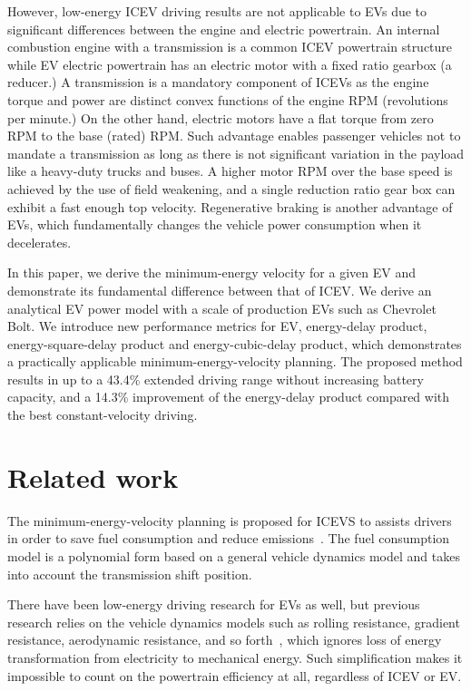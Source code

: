 \documentclass{IEEEtran}
\begin{document}
However, low-energy ICEV driving results are not applicable to EVs due to significant differences 
between the engine  and electric  powertrain. An internal combustion engine with a transmission is a common ICEV powertrain structure while EV electric powertrain has an electric motor with a fixed ratio gearbox (a reducer.) A transmission is a mandatory component of ICEVs as the engine torque and power are distinct convex functions of the engine RPM (revolutions per minute.) On the other hand, electric motors have a flat torque from zero RPM to the base (rated) RPM. Such advantage enables passenger vehicles not to mandate a transmission as long as there is not significant variation in the payload like a heavy-duty trucks and buses. A higher motor RPM over the base speed is achieved by the use of field weakening, and a single reduction ratio gear box can exhibit a fast enough top velocity. Regenerative braking is another advantage of EVs, which fundamentally changes the vehicle power consumption when it decelerates.

In this paper, we derive the minimum-energy velocity for a given EV and demonstrate its fundamental difference between that of ICEV. 
We derive an analytical EV power model with a scale of production EVs such as Chevrolet  Bolt. We introduce new performance metrics for EV, energy-delay product, energy-square-delay product and energy-cubic-delay product, which demonstrates a practically applicable minimum-energy-velocity planning. The proposed method results in up to a 43.4\% extended driving range without increasing battery capacity, and a 14.3\% improvement of the energy-delay product compared with the best constant-velocity driving. 

\section{Related work} \label{sec:related work}
  
The minimum-energy-velocity planning is proposed for ICEVS to assists drivers in order to save fuel consumption and reduce emissions~\cite{Seraens:thesis12, Kamal:TITS11, Ozatay:TITS14, Dovgana:ASC14, Ozatay:IFAC14, Khayyam:ESA12}.  
The fuel consumption model is a polynomial form based on a general vehicle dynamics model and takes into account the transmission shift position. 

There have been low-energy driving research for EVs as well, but previous research relies on the  vehicle dynamics models such as rolling resistance, gradient resistance, aerodynamic resistance, and so forth~\cite{Yan:NAPS14}, which ignores loss of energy transformation from electricity to mechanical energy. Such simplification makes it impossible to count on the powertrain efficiency at all, regardless of ICEV or EV. 
\end{document}

